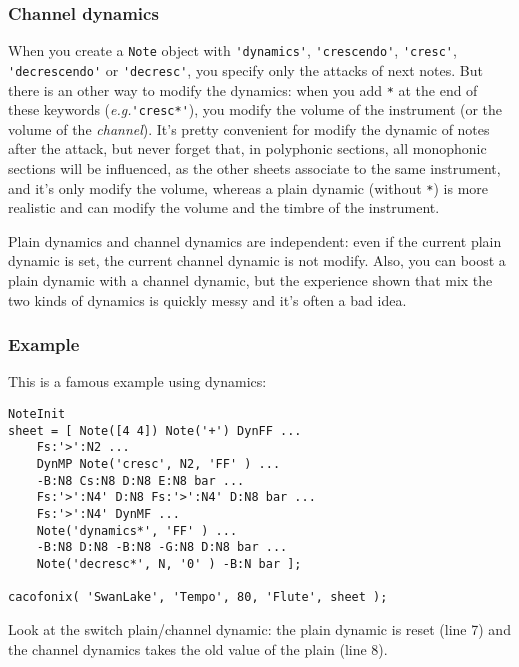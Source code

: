 \documentclass{article}
\newcommand{\note}{\lstinline!Note!\xspace}
\newcommand{\eg}{\emph{e.g.}\xspace}
\begin{document}
\subsubsection{Channel dynamics}
\label{sec:ChannelDynamics}

When you create a \note object with \lstinline!'dynamics'!, \lstinline!'crescendo'!, \lstinline!'cresc'!, \lstinline!'decrescendo'! or \lstinline!'decresc'!, you specify only the attacks of next notes. But there is an other way to modify the dynamics: when you add \lstinline!*! at the end of these keywords (\eg \lstinline!'cresc*'!), you modify the volume of the instrument (or the volume of the \emph{channel}). It's pretty convenient for modify the dynamic of notes after the attack, but never forget that, in polyphonic sections, all monophonic sections will be influenced, as the other sheets associate to the same instrument, and it's only modify the volume, whereas a plain dynamic (without \lstinline!*!) is more realistic and can modify the volume and the timbre of the instrument.

Plain dynamics and channel dynamics are independent: even if the current plain dynamic is set, the current channel dynamic is not modify. Also, you can boost a plain dynamic with a channel dynamic, but the experience shown that mix the two kinds of dynamics is quickly messy and it's often a bad idea.

\subsubsection{Example}

This is a famous example using dynamics: \\

\begin{lstlisting}
NoteInit
sheet = [ Note([4 4]) Note('+') DynFF ...
	Fs:'>':N2 ...
	DynMP Note('cresc', N2, 'FF' ) ...
	-B:N8 Cs:N8 D:N8 E:N8 bar ...
	Fs:'>':N4' D:N8 Fs:'>':N4' D:N8 bar ...
	Fs:'>':N4' DynMF ...
	Note('dynamics*', 'FF' ) ...
	-B:N8 D:N8 -B:N8 -G:N8 D:N8 bar ...
	Note('decresc*', N, '0' ) -B:N bar ];

cacofonix( 'SwanLake', 'Tempo', 80, 'Flute', sheet );
\end{lstlisting}

Look at the switch plain/channel dynamic: the plain dynamic is reset (line 7) and the channel dynamics takes the old value of the plain (line 8).
\end{document}
